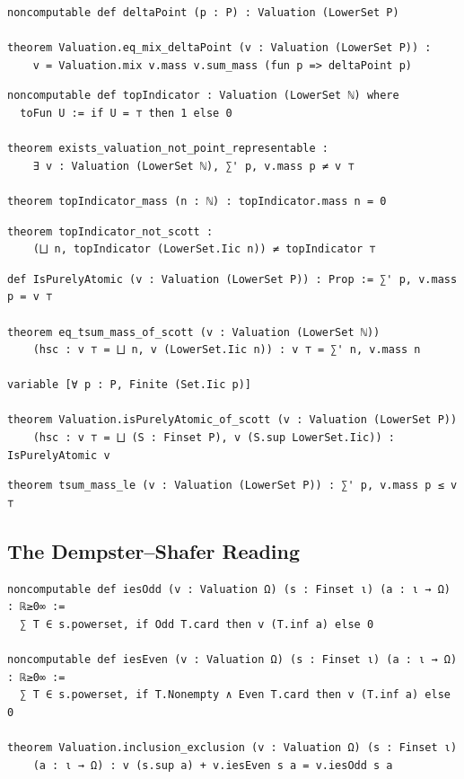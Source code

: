 \label{lean:valuation-eq-mix-deltapoint}
\begin{lstlisting}
noncomputable def deltaPoint (p : P) : Valuation (LowerSet P)

theorem Valuation.eq_mix_deltaPoint (v : Valuation (LowerSet P)) :
    v = Valuation.mix v.mass v.sum_mass (fun p => deltaPoint p)
\end{lstlisting}

\label{lean:exists-valuation-not-point-representable}
\begin{lstlisting}
noncomputable def topIndicator : Valuation (LowerSet ℕ) where
  toFun U := if U = ⊤ then 1 else 0

theorem exists_valuation_not_point_representable :
    ∃ v : Valuation (LowerSet ℕ), ∑' p, v.mass p ≠ v ⊤

theorem topIndicator_mass (n : ℕ) : topIndicator.mass n = 0
\end{lstlisting}

\label{lean:topindicator-not-scott}
\begin{lstlisting}
theorem topIndicator_not_scott :
    (⨆ n, topIndicator (LowerSet.Iic n)) ≠ topIndicator ⊤
\end{lstlisting}

\label{lean:eq-tsum-mass-of-scott}
\begin{lstlisting}
def IsPurelyAtomic (v : Valuation (LowerSet P)) : Prop := ∑' p, v.mass p = v ⊤

theorem eq_tsum_mass_of_scott (v : Valuation (LowerSet ℕ))
    (hsc : v ⊤ = ⨆ n, v (LowerSet.Iic n)) : v ⊤ = ∑' n, v.mass n

variable [∀ p : P, Finite (Set.Iic p)]

theorem Valuation.isPurelyAtomic_of_scott (v : Valuation (LowerSet P))
    (hsc : v ⊤ = ⨆ (S : Finset P), v (S.sup LowerSet.Iic)) : IsPurelyAtomic v
\end{lstlisting}

\label{lean:tsum-mass-le}
\begin{lstlisting}
theorem tsum_mass_le (v : Valuation (LowerSet P)) : ∑' p, v.mass p ≤ v ⊤
\end{lstlisting}

\subsection{The Dempster--Shafer Reading}

\label{lean:inclusion-exclusion}
\begin{lstlisting}
noncomputable def iesOdd (v : Valuation Ω) (s : Finset ι) (a : ι → Ω) : ℝ≥0∞ :=
  ∑ T ∈ s.powerset, if Odd T.card then v (T.inf a) else 0

noncomputable def iesEven (v : Valuation Ω) (s : Finset ι) (a : ι → Ω) : ℝ≥0∞ :=
  ∑ T ∈ s.powerset, if T.Nonempty ∧ Even T.card then v (T.inf a) else 0

theorem Valuation.inclusion_exclusion (v : Valuation Ω) (s : Finset ι)
    (a : ι → Ω) : v (s.sup a) + v.iesEven s a = v.iesOdd s a
\end{lstlisting}

